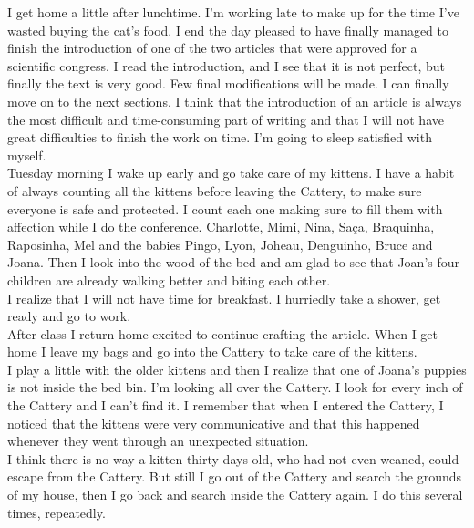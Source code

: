 \documentclass[11pt]{book}
\begin{document}
\noindent I get home a little after lunchtime. I'm working late to make up for the time I've wasted buying the cat's food. I end the day pleased to have finally managed to finish the introduction of one of the two articles that were approved for a scientific congress. I read the introduction, and I see that it is not perfect, but finally the text is very good. Few final modifications will be made. I can finally move on to the next sections. I think that the introduction of an article is always the most difficult and time-consuming part of writing and that I will not have great difficulties to finish the work on time. I'm going to sleep satisfied with myself. \\

\noindent Tuesday morning I wake up early and go take care of my kittens. I have a habit of always counting all the kittens before leaving the Cattery, to make sure everyone is safe and protected. I count each one making sure to fill them with affection while I do the conference. Charlotte, Mimi, Nina, Saça, Braquinha, Raposinha, Mel and the babies Pingo, Lyon, Joheau, Denguinho, Bruce and Joana. Then I look into the wood of the bed and am glad to see that Joan's four children are already walking better and biting each other. \\

\noindent I realize that I will not have time for breakfast. I hurriedly take a shower, get ready and go to work. \\

\noindent After class I return home excited to continue crafting the article. When I get home I leave my bags and go into the Cattery to take care of the kittens. \\

\noindent I play a little with the older kittens and then I realize that one of Joana's puppies is not inside the bed bin. I'm looking all over the Cattery. I look for every inch of the Cattery and I can't find it. I remember that when I entered the Cattery, I noticed that the kittens were very communicative and that this happened whenever they went through an unexpected situation.  \\

\noindent I think there is no way a kitten thirty days old, who had not even weaned, could escape from the Cattery. But still I go out of the Cattery and search the grounds of my house, then I go back and search inside the Cattery again. I do this several times, repeatedly. \\
\end{document}
